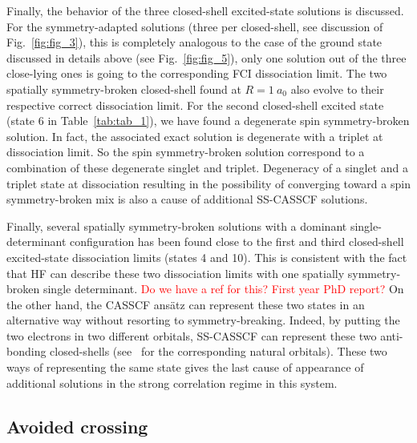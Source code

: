 \documentclass[aip,jcp,reprint,noshowkeys,superscriptaddress]{revtex4-1}
\newcommand{\todo}[1]{\textcolor{red}{#1}}
\begin{document}
Finally, the behavior of the three closed-shell excited-state solutions is discussed.
For the symmetry-adapted solutions (three per closed-shell, see discussion of Fig.~\ref{fig:fig_3}), this is completely analogous to the case of the ground state discussed in details above (see Fig.~\ref{fig:fig_5}), \ie only one solution out of the three close-lying ones is going to the corresponding FCI dissociation limit.
The two spatially symmetry-broken closed-shell found at $R=1~a_0$ also evolve to their respective correct dissociation limit.
For the second closed-shell excited state (state 6 in Table~\ref{tab:tab_1}), we have found a degenerate spin symmetry-broken solution.
In fact, the associated exact solution is degenerate with a triplet at dissociation limit.
So the spin symmetry-broken solution correspond to a combination of these degenerate singlet and triplet.
Degeneracy of a singlet and a triplet state at dissociation resulting in the possibility of converging toward a spin symmetry-broken mix is also a cause of additional SS-CASSCF solutions.

Finally, several spatially symmetry-broken solutions with a dominant single-determinant configuration has been found close to the first and third closed-shell excited-state dissociation limits (states 4 and 10).
This is consistent with the fact that HF can describe these two dissociation limits with one spatially symmetry-broken single determinant. \todo{Do we have a ref for this? First year PhD report?}
On the other hand, the CASSCF ans\"atz can represent these two states in an alternative way without resorting to symmetry-breaking.
Indeed, by putting the two electrons in two different orbitals, SS-CASSCF can represent these two anti-bonding closed-shells (see \SupInf~for the corresponding natural orbitals).
These two ways of representing the same state gives the last cause of appearance of additional solutions in the strong correlation regime in this system.

\subsection{Avoided crossing}
\label{sec:avoided}
\end{document}
